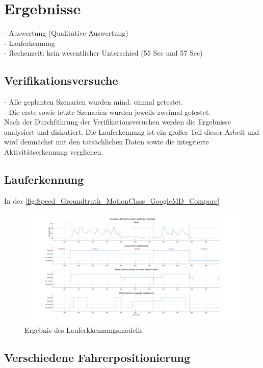 \chapter{Ergebnisse}


- Auswertung (Qualitative Auswertung)\\
- Lauferkennung \\
- Rechenzeit: kein wesentlicher Unterschied (55 Sec und 57 Sec)

\section{Verifikationsversuche}

- Alle geplanten Szenarien wurden mind. einmal getestet.\\

- Die erste sowie letzte Szenarien wurden jeweils zweimal getestet.\\

Nach der Durchführung der Verifikationsveruchen werden die Ergebnisse analysiert und diskutiert. Die Lauferkennung ist ein großer Teil dieser Arbeit und wird demnächst mit den tatsächlichen Daten sowie die integrierte Aktivitätserkennung verglichen.
\section{Lauferkennung}
In der \autoref{fig:Speed_Groundtruth_MotionClass_GoogleMD_Compare} 
\begin{figure}[H]
	\centering
	\includegraphics[width=\linewidth]{Bilder/Speed_Groundtruth_MotionClass_GoogleMD_Compare.png}
	\caption{Ergebnis des Lauferkkennungsmodells}
	\label{fig:Speed_Groundtruth_MotionClass_GoogleMD_Compare}
\end{figure}



\section{Verschiedene Fahrerpositionierung}

